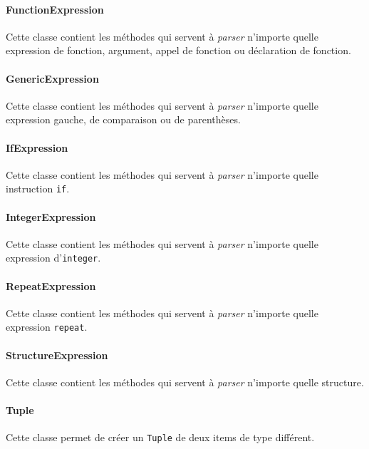 \paragraph{FunctionExpression}

Cette classe contient les méthodes qui servent à \emph{parser} n'importe quelle expression de fonction, argument, appel de fonction ou déclaration de fonction.

\paragraph{GenericExpression}

Cette classe contient les méthodes qui servent à \emph{parser} n'importe quelle expression gauche, de comparaison ou de parenthèses.

\paragraph{IfExpression}

Cette classe contient les méthodes qui servent à \emph{parser} n'importe quelle instruction \texttt{if}.

\paragraph{IntegerExpression}

Cette classe contient les méthodes qui servent à \emph{parser} n'importe quelle expression d'\texttt{integer}.

\paragraph{RepeatExpression}

Cette classe contient les méthodes qui servent à \emph{parser} n'importe quelle expression \texttt{repeat}.

\paragraph{StructureExpression}

Cette classe contient les méthodes qui servent à \emph{parser} n'importe quelle structure.

\paragraph{Tuple}

Cette classe permet de créer un \texttt{Tuple} de deux items de type différent.

